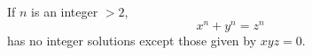 \begin{proposition}\label{eq:159}
    If $n$ is an integer $>2$,
\[
    x^n+y^n=z^n
\]
    has no integer solutions except those given by $xyz=0$.
\end{proposition}
